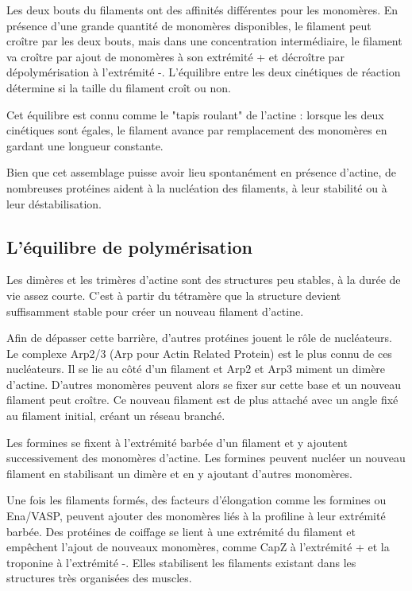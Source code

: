 Les deux bouts du filaments ont des affinités différentes pour les monomères. En présence d'une grande quantité de monomères disponibles, le filament peut croître par les deux bouts, mais dans une concentration intermédiaire, le filament va croître par ajout de monomères à son extrémité + et décroître par dépolymérisation à l'extrémité -. L'équilibre entre les deux cinétiques de réaction détermine si la taille du filament croît ou non. 

Cet équilibre est connu comme le "tapis roulant" de l'actine : lorsque les deux cinétiques sont égales, le filament avance par remplacement des monomères en gardant une longueur constante. 

Bien que cet assemblage puisse avoir lieu spontanément en présence d'actine, de nombreuses protéines aident à la nucléation des filaments, à leur stabilité ou à leur déstabilisation. 

\subsection{L'équilibre de polymérisation}

Les dimères et les trimères d'actine sont des structures peu stables, à la durée de vie assez courte. C'est à partir du tétramère que la structure devient suffisamment stable pour créer un nouveau filament d'actine. 

Afin de dépasser cette barrière, d'autres protéines jouent le rôle de nucléateurs. Le complexe Arp2/3 (Arp pour Actin Related Protein) est le plus connu de ces nucléateurs. Il se lie au côté d'un filament et Arp2 et Arp3 miment un dimère d'actine. D'autres monomères peuvent alors se fixer sur cette base et un nouveau filament peut croître. Ce nouveau filament est de plus attaché avec un angle fixé au filament initial, créant un réseau branché. 

Les formines se fixent à l'extrémité barbée d'un filament et y ajoutent successivement des monomères d'actine. Les formines peuvent nucléer un nouveau filament en stabilisant un dimère et en y ajoutant d'autres monomères. 


Une fois les filaments formés, des facteurs d'élongation comme les formines ou Ena/VASP, peuvent ajouter des monomères liés à la profiline à leur extrémité barbée.
Des protéines de coiffage se lient à une extrémité du filament et empêchent l'ajout de nouveaux monomères, comme CapZ à l'extrémité +  et la troponine à l'extrémité -. Elles stabilisent les filaments existant dans les structures très organisées des muscles. 

